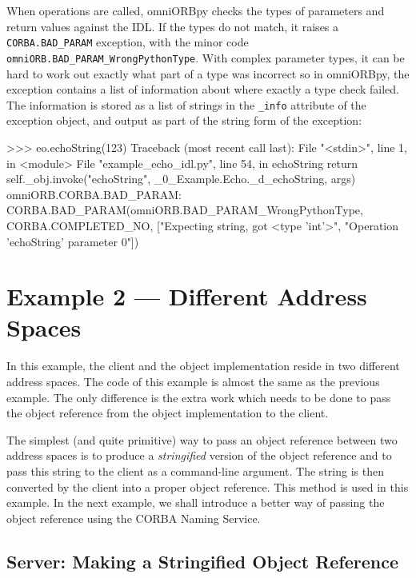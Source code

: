 \documentclass[11pt,oneside,a4paper]{book}
\newcommand{\code}[1]{\texttt{#1}}
\newcommand{\term}[1]{\textit{#1}}
\newcommand{\dsc}{\discretionary{}{}{}}
\begin{document}
When operations are called, omniORBpy checks the types of parameters
and return values against the IDL. If the types do not match, it
raises a \code{CORBA.BAD\_\dsc{}PARAM} exception, with the minor code
\code{omniORB.BAD\_PARAM\_WrongPythonType}. With complex parameter
types, it can be hard to work out exactly what part of a type was
incorrect so in omniORBpy, the exception contains a list of
information about where exactly a type check failed. The information
is stored as a list of strings in the \code{\_info} attribute of the
exception object, and output as part of the string form of the
exception:

\begin{pylisting}
>>> eo.echoString(123)
Traceback (most recent call last):
  File "<stdin>", line 1, in <module>
  File "example_echo_idl.py", line 54, in echoString
    return self._obj.invoke("echoString", _0_Example.Echo._d_echoString, args)
omniORB.CORBA.BAD_PARAM: CORBA.BAD_PARAM(omniORB.BAD_PARAM_WrongPythonType,
  CORBA.COMPLETED_NO, ["Expecting string, got <type 'int'>",
                       "Operation 'echoString' parameter 0"])
\end{pylisting}



\section{Example 2 --- Different Address Spaces}

In this example, the client and the object implementation reside in
two different address spaces. The code of this example is almost the
same as the previous example. The only difference is the extra work
which needs to be done to pass the object reference from the object
implementation to the client.

The simplest (and quite primitive) way to pass an object reference
between two address spaces is to produce a \term{stringified} version
of the object reference and to pass this string to the client as a
command-line argument.  The string is then converted by the client
into a proper object reference.  This method is used in this
example. In the next example, we shall introduce a better way of
passing the object reference using the CORBA Naming Service.


\subsection{Server: Making a Stringified Object Reference}
\end{document}
